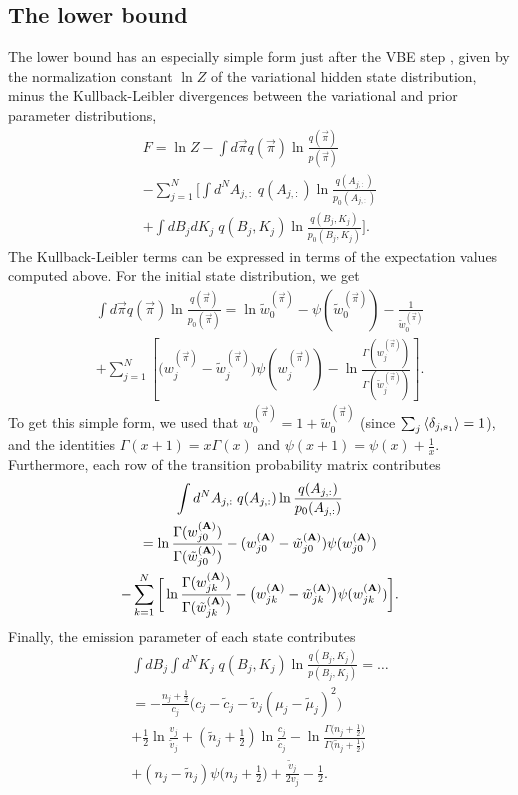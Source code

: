\subsection{The lower bound}
The lower bound has an especially simple form just after the VBE step
\cite{mackay1997,beal2003,persson2013}, given by the normalization
constant $\ln Z$ of the variational hidden state distribution, minus
the Kullback-Leibler divergences between the variational and prior
parameter distributions,
\begin{multline}
  F=\ln Z
  -\int d\vec{\pi} q(\vec{\pi}) \ln\frac{q(\vec{\pi})}{p(\vec{\pi})}\\
  -\sum_{j=1}^N\Bigg[
  \int d^NA_{j,:}\;q(A_{j,:})\ln\frac{q(A_{j,:})}{p_0(A_{j,:})}\\
  +\int dB_jdK_j\;q(B_j,K_j)\ln\frac{q(B_j,K_j)}{p_0(B_j,K_j)}
  \Bigg].
\end{multline}
The Kullback-Leibler terms can be expressed in terms of the
expectation values computed above. For the initial state distribution,
we get
\begin{multline}
  \int d\vec{\pi} q(\vec{\pi}) \ln\frac{q(\vec{\pi})}{p_0(\vec{\pi})}
  =\ln\tilde w_0^{(\vec{\pi})}
    -\psi(\tilde w_0^{(\vec{\pi})})-\frac{1}{\tilde w_0^{(\vec{\pi})}}\\
    +\sum_{j=1}^N\left[
      \big(w_j^{(\vec{\pi})}-\tilde w_j^{(\vec{\pi})}\big)\psi(w_j^{(\vec{\pi})})
      -\ln\frac{\Gamma(w_j^{(\vec{\pi})})}{\Gamma(\tilde w_j^{(\vec{\pi})})}
      \right].
\end{multline}
To get this simple form, we used that $w_0^{(\vec{\pi})}=1+\tilde
w_0^{(\vec{\pi})}$ (since $\sum_j\left\langle \delta_{j,s_1}\right\rangle=1$), and the
identities $\Gamma(x+1)=x\Gamma(x)$ and $\psi(x+1)=\psi(x)+\frac 1x$.
Furthermore, each row of the transition probability matrix contributes
\begin{multline}
  \int d^NA_{j,:}\;q(A_{j,:})\ln\frac{q(A_{j,:})}{p_0(A_{j,:})}\\
  =\ln\frac{\Gamma(w_{j0}^{(\mathbf{A})})}{\Gamma(\tilde w_{j0}^{(\mathbf{A})})}
    -(w_{j0}^{(\mathbf{A})}-\tilde w_{j0}^{(\mathbf{A})})\psi(w_{j0}^{(\mathbf{A})})\\
    -\sum_{k=1}^N\bigg[
      \ln\frac{\Gamma(w_{jk}^{(\mathbf{A})})}{\Gamma(\tilde w_{jk}^{(\mathbf{A})})}
      -\big(w_{jk}^{(\mathbf{A})}-\tilde w_{jk}^{(\mathbf{A})}\big)
      \psi(w_{jk}^{(\mathbf{A})})\bigg].
\end{multline}
Finally, the emission parameter of each state contributes
\begin{multline}\label{seq:KBKL}
  \int dB_j\int d^NK_j\;q(B_j,K_j)
  \ln\frac{q(B_j,K_j)}{p(B_j,K_j)}=\ldots\\
  =-\frac{n_j+\frac 12}{c_j}
    \Big(c_j-\tilde c_j-\tilde v_j(\mu_j-\tilde \mu_j)^2\Big)\\
    +\frac 12\ln\frac{v_j}{\tilde v_j}
    +(\tilde n_j+\frac 12)\ln\frac{c_j}{\tilde c_j}
    -\ln\frac{\Gamma\big(n_j+\frac 12\big)}{\Gamma\big(\tilde n_j+\frac 12\big)}\\
    +(n_j-\tilde n_j)\psi\big(n_j+\frac 12\big)
    +\frac{\tilde v_j}{2v_j}
    -\frac 12.
\end{multline}


